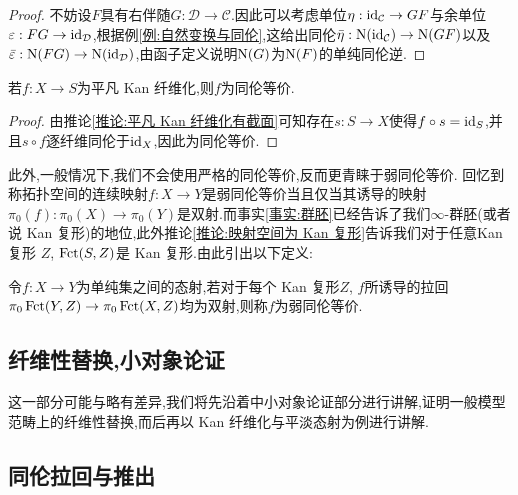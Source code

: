 \begin{proof}
    不妨设$F$具有右伴随$G : \mathcal{D}\to \mathcal{C}$.因此可以考虑单位$\eta : \mathrm{id}_{\mathcal{C}}\to GF$与余单位$\varepsilon : FG \to \mathrm{id}_{\mathcal{D}}$,根据例\ref{例:自然变换与同伦},这给出同伦$\bar{\eta}: \operatorname{N}(\mathrm{id}_{\mathcal{C}})\to \operatorname{N}(GF)$以及$\bar{\varepsilon}: \operatorname{N}(FG) \to \operatorname{N}(\mathrm{id}_{\mathcal{D}})$,由函子定义说明$\operatorname{N} (G)$为$\operatorname{N} (F)$的单纯同伦逆.
\end{proof}
\begin{proposition}
    若$f:X\to S$为平凡 Kan 纤维化,则$f$为同伦等价.
\end{proposition}
\begin{proof}
    由推论\ref{推论:平凡 Kan 纤维化有截面}可知存在$s: S\to X$使得$f\circ s = \mathrm{id}_S$,并且$s\circ f$逐纤维同伦于$\mathrm{id}_X$,因此为同伦等价.
\end{proof}
此外,一般情况下,我们不会使用严格的同伦等价,反而更青睐于弱同伦等价.
回忆到称拓扑空间的连续映射$f : X \to Y$是弱同伦等价当且仅当其诱导的映射$\pi_0(f) : \pi_0(X)\to \pi_0(Y)$是双射.而事实\ref{事实:群胚}已经告诉了我们$\infty$-群胚(或者说 Kan 复形)的地位,此外推论\ref{推论:映射空间为 Kan 复形}告诉我们对于任意Kan 复形 $Z$, $\operatorname{Fct}(S,Z)$是 Kan 复形.由此引出以下定义:
\begin{definition}[弱同伦等价]\label{定义:弱同伦等价}
    令$f: X \to Y$为单纯集之间的态射,若对于每个 Kan 复形$Z$, $f$所诱导的拉回$\pi_0\operatorname{Fct}(Y,Z) \to \pi_0\operatorname{Fct}(X,Z)$均为双射,则称$f$为弱同伦等价.
\end{definition}
\subsection{纤维性替换,小对象论证}
这一部分可能与\parencite[\href{https://kerodon.net/tag/00UU}{00UU}]{Kerodon}略有差异,我们将先沿着\parencite[Proposition A.1.2.5]{HTT}中小对象论证部分进行讲解,证明一般模型范畴上的纤维性替换,而后再以 Kan 纤维化与平淡态射为例进行讲解.

\subsection{同伦拉回与推出}
